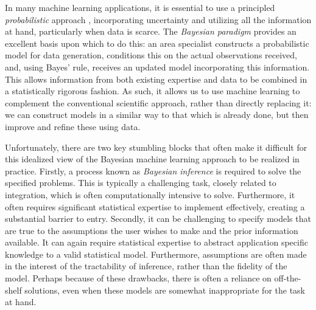 In many machine learning applications, it is essential to use a principled \emph{probabilistic} 
approach \citep{ghahramani2015probabilistic}, incorporating uncertainty and utilizing all the information at hand, 
particularly when data is scarce.  The \emph{Bayesian paradigm} provides an excellent basis upon which to do this: an area 
specialist constructs a probabilistic model for data generation, conditions this on the actual observations received, 
and, using Bayes' rule, receives an updated model incorporating this information.  This
allows information from both existing expertise and data to be combined in a statistically
rigorous fashion.  As such, it allows us to use machine learning to complement the conventional
scientific approach, rather than directly replacing it: we can construct models in a similar way to
that which is already done, but then improve and refine these using data.

Unfortunately, there are two key stumbling blocks that often make it difficult for this idealized
view of the Bayesian machine learning approach to be realized in practice.  Firstly, a process 
known as \emph{Bayesian inference} is
required to solve the specified problems.  This is typically a challenging task, closely 
related to integration, which is often computationally intensive to solve.  Furthermore, it often
requires significant statistical expertise to implement effectively, creating a substantial barrier to
entry.  
Secondly, it can be challenging to specify models that are true to the assumptions the user
wishes to make and the prior information available.  It can again require statistical expertise to abstract
application specific knowledge to a valid statistical model.  Furthermore, assumptions are often made in the interest
of the tractability of inference, rather than the fidelity of the model.  Perhaps because of these drawbacks, there is often
a reliance on off-the-shelf solutions, even when these models are somewhat inappropriate for the task
at hand.


